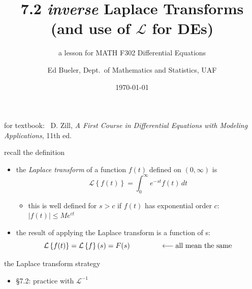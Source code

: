 \documentclass[urlcolor=blue,dvipsnames]{beamer}
\title{7.2 \emph{inverse} Laplace Transforms \\ (and use of $\mathcal{L}$ for DEs)}
\subtitle{a lesson for MATH F302 Differential Equations}
\author{Ed Bueler, Dept.~of Mathematics and Statistics, UAF}
\date{\tiny \today}
\begin{document}
\renewcommand{\thefootnote}{{\color{green} \arabic{footnote}}}

\begin{frame}
\titlepage

\centerline{\tiny for textbook: \, D. Zill, \emph{A First Course in Differential Equations with Modeling Applications}, 11th ed.}
\end{frame}

\newcommand{\LL}[1]{\mathcal{L}\left\{#1\right\}}
\newcommand{\LLi}[1]{\mathcal{L}^{-1}\left\{#1\right\}}

\begin{frame}{recall the definition}

\begin{itemize}
\item the \emph{Laplace transform} of a function $f(t)$ defined on $(0,\infty)$ is
    $$\LL{f(t)} = \int_0^\infty e^{-st} f(t)\,dt$$
    \begin{itemize}
    \item this is well defined for $s>c$ if $f(t)$ has exponential order $c$:  $|f(t)| \le M e^{ct}$
    \end{itemize}

\bigskip
\item the result of applying the Laplace transform is a function of s:
    $$\LL{f(t)} = \LL{f}(s) = F(s) \hspace{15mm} \longleftarrow \text{all mean the same}$$
\end{itemize}
\end{frame}


\begin{frame}{the Laplace transform strategy}

\begin{center}
\end{center}

\vspace{10mm}
\begin{itemize}
\item \S 7.2: practice with $\mathcal{L}^{-1}$
\end{itemize}
\end{frame}
\end{document}
